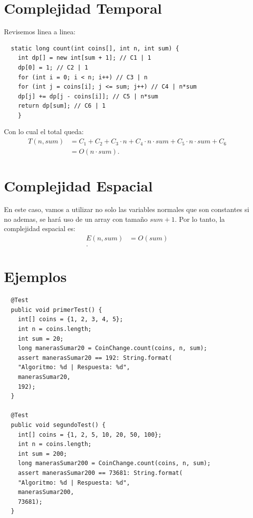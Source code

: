 \documentclass{report}
\begin{document}
\section{Complejidad Temporal}

Revisemos linea a linea:
\begin{verbatim}
  static long count(int coins[], int n, int sum) {
    int dp[] = new int[sum + 1]; // C1 | 1
    dp[0] = 1; // C2 | 1
    for (int i = 0; i < n; i++) // C3 | n
    for (int j = coins[i]; j <= sum; j++) // C4 | n*sum
    dp[j] += dp[j - coins[i]]; // C5 | n*sum
    return dp[sum]; // C6 | 1
    }
\end{verbatim}

Con lo cual el total queda:
\begin{align*}
  T\left( n, sum \right) &= C_1 + C_2 + C_3\cdot n + C_4 \cdot n\cdot sum + C_5\cdot n\cdot sum + C_6 \\
			 &= O\left( n\cdot sum \right)
		       .\end{align*}

		       \section{Complejidad Espacial}

		       En este caso, vamos a utilizar no solo las variables normales que son constantes si no ademas, se hará uso de un array con tamaño $sum + 1$. Por lo tanto, la complejidad espacial es:
		       \begin{align*}
			 E\left( n, sum \right) &= O\left( sum \right)  \\
		       .\end{align*}

		       \section{Ejemplos}

		       \begin{verbatim}
  @Test
  public void primerTest() {
    int[] coins = {1, 2, 3, 4, 5};
    int n = coins.length;
    int sum = 20;
    long manerasSumar20 = CoinChange.count(coins, n, sum);
    assert manerasSumar20 == 192: String.format(
    "Algoritmo: %d | Respuesta: %d",
    manerasSumar20,
    192);
  }

  @Test
  public void segundoTest() {
    int[] coins = {1, 2, 5, 10, 20, 50, 100};
    int n = coins.length;
    int sum = 200;
    long manerasSumar200 = CoinChange.count(coins, n, sum);
    assert manerasSumar200 == 73681: String.format(
    "Algoritmo: %d | Respuesta: %d",
    manerasSumar200,
    73681);
  }
		       \end{verbatim}
\end{document}
